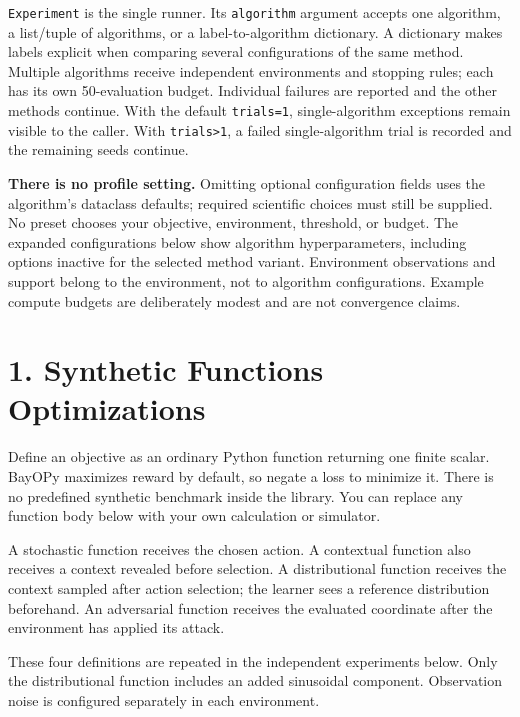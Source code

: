 \documentclass[10pt,a4paper]{article}
\begin{document}
\texttt{Experiment} is the single runner. Its \texttt{algorithm} argument accepts one algorithm,\allowbreak{} a list/tuple of algorithms,\allowbreak{} or a label-to-algorithm dictionary. A dictionary makes labels explicit when comparing several configurations of the same method. Multiple algorithms receive independent environments and stopping rules; each has its own 50-evaluation budget. Individual failures are reported and the other methods continue. With the default \texttt{trials=\allowbreak{}1},\allowbreak{} single-algorithm exceptions remain visible to the caller. With \texttt{trials>1},\allowbreak{} a failed single-algorithm trial is recorded and the remaining seeds continue.


\textbf{There is no profile setting.} Omitting optional configuration fields uses the algorithm's dataclass defaults; required scientific choices must still be supplied. No preset chooses your objective,\allowbreak{} environment,\allowbreak{} threshold,\allowbreak{} or budget. The expanded configurations below show algorithm hyperparameters,\allowbreak{} including options inactive for the selected method variant. Environment observations and support belong to the environment,\allowbreak{} not to algorithm configurations. Example compute budgets are deliberately modest and are not convergence claims.



\clearpage
{}
\section*{1. Synthetic Functions Optimizations}

Define an objective as an ordinary Python function returning one finite scalar. BayOPy maximizes reward by default,\allowbreak{} so negate a loss to minimize it. There is no predefined synthetic benchmark inside the library. You can replace any function body below with your own calculation or simulator.


A stochastic function receives the chosen action. A contextual function also receives a context revealed before selection. A distributional function receives the context sampled after action selection; the learner sees a reference distribution beforehand. An adversarial function receives the evaluated coordinate after the environment has applied its attack.


These four definitions are repeated in the independent experiments below. Only the distributional function includes an added sinusoidal component. Observation noise is configured separately in each environment.
\end{document}

